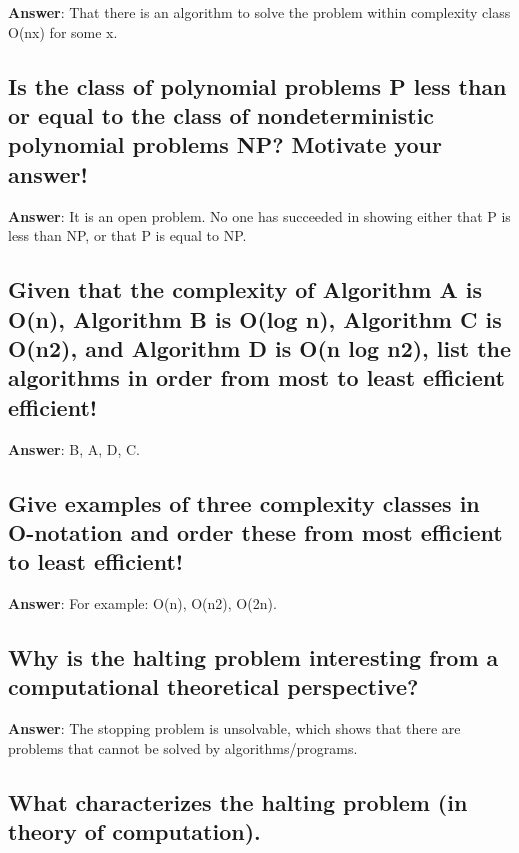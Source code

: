 \documentclass[a4paper,11pt,oneside]{article}
\begin{document}
\begin{sloppypar}
\label{q:335:sa:en:True}

\textbf{Answer}: That there is an algorithm to solve the problem within complexity class O(nx) for some x.



\subsection{Is the class of polynomial problems P less than or equal to the class of nondeterministic polynomial problems NP? Motivate your answer!}

\label{q:336:sa:en:True}

\textbf{Answer}: It is an open problem. No one has succeeded in showing either that P is less than NP, or that P is equal to NP.



\subsection{Given that the complexity of Algorithm A is O(n), Algorithm B is O(log n), Algorithm C is O(n2), and Algorithm D is O(n log n2), list the algorithms in order from most to least efficient efficient!}

\label{q:337:sa:en:True}

\textbf{Answer}: B, A, D, C.



\subsection{Give examples of three complexity classes in O-notation and order these from most efficient to least efficient!}

\label{q:338:sa:en:True}

\textbf{Answer}: For example: O(n), O(n2), O(2n).



\subsection{Why is the halting problem interesting from a computational theoretical perspective?}

\label{q:339:sa:en:True}

\textbf{Answer}: The stopping problem is unsolvable, which shows that there are problems that cannot be solved by algorithms/programs.



\subsection{What characterizes the halting problem (in theory of computation).}


\end{sloppypar}
\end{document}
